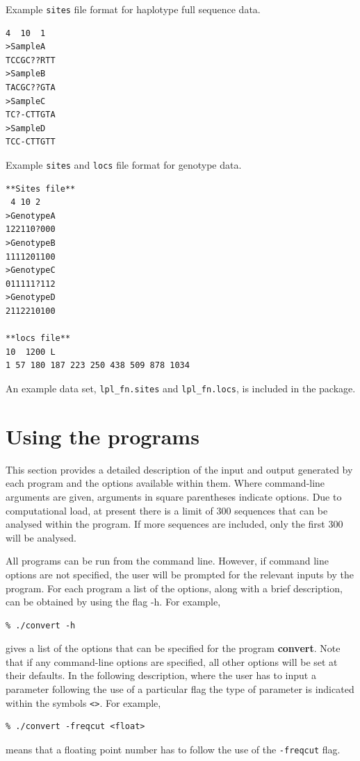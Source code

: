 \documentclass[a4paper,10pt,fullpage]{article}
\begin{document}
\vspace{0.5cm}
\noindent Example {\verb+sites+} file format for haplotype full sequence data.
\begin{verbatim}
4  10  1
>SampleA
TCCGC??RTT
>SampleB
TACGC??GTA
>SampleC
TC?-CTTGTA
>SampleD
TCC-CTTGTT
\end{verbatim}
\vspace{0.5cm} \noindent Example {\verb+sites+} and {\verb+locs+} file
format for genotype data.
\begin{verbatim}
**Sites file**
 4 10 2
>GenotypeA
122110?000
>GenotypeB
1111201100
>GenotypeC
011111?112
>GenotypeD
2112210100

**locs file**
10  1200 L
1 57 180 187 223 250 438 509 878 1034
\end{verbatim}

\noindent An example data set, {\verb+lpl_fn.sites+} and {\verb+lpl_fn.locs+},
is included in the package.

\section{Using the programs}
This section provides a detailed description of the input and
output generated by each program and the options available within
them.  Where command-line arguments are given, arguments in square
parentheses indicate options.   Due to computational load, at
present there is a limit of 300 sequences that can be analysed
within the program.  If more sequences are included, only the
first 300 will be analysed.

All programs can be run from the command line.  However, if command line options are not specified, the user will be prompted for the relevant inputs by the program.  For each program a list of the options, along with a brief description, can be obtained by using the flag -h.  For example, \\
\begin{verbatim}
% ./convert -h 
\end{verbatim}
gives a list of the options that can be specified for the program {\bf convert}.  Note that if any command-line options are specified, all other options will be set at their defaults. In the following description, where the user has to input a parameter following the use of a particular flag the type of parameter is indicated within the symbols \verb+<>+.  For example,  \\
\begin{verbatim}
% ./convert -freqcut <float> 
\end{verbatim}
means that a floating point number has to follow the use of the \verb+-freqcut+ flag.
\end{document}
